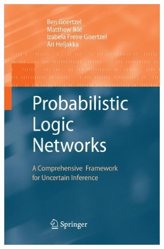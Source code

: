 \documentclass[aspectratio=169]{beamer}
\begin{document}
\begin{frame}





  \begin{columns}
    \column{2.5in}
    \includegraphics[scale=0.32]{images/PLN.jpg}\\


\end{columns}
\end{frame}
\end{document}

